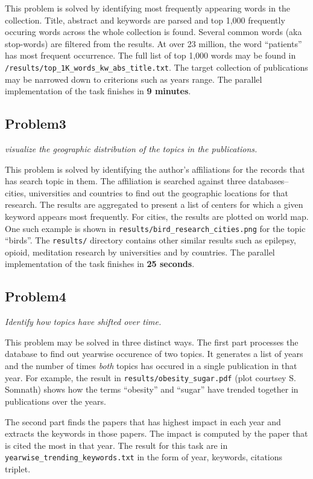 \documentclass{article}
\begin{document}
This problem is solved by identifying most frequently appearing words in the
collection. Title, abstract and keywords are parsed and top 1,000 frequently
occuring words across the whole collection is found. Several common words (aka
stop-words) are filtered from the results. At over 23 million, the word
``patients'' has most frequent occurrence. The full list of top 1,000 words
may be found in \texttt{/results/top\_1K\_words\_kw\_abs\_title.txt}. The
target collection of publications may be narrowed down to criterions such as
years range.  The parallel implementation of the task finishes in \textbf{9
minutes}.

\subsection*{Problem3}
\textit{visualize the geographic distribution of the topics in the publications.}

This problem is solved by identifying the author's affiliations for the records
that has search topic in them. The affiliation is searched against
three databases--cities, universities and countries to find out the geographic
locations for that research. The results are aggregated to present a list of
centers for which a given keyword appears most frequently. For cities, the
results are plotted on world map. One such example is shown in
\texttt{results/bird\_research\_cities.png} for the topic ``birds''. The \texttt{results/}
directory contains other similar results such as epilepsy, opioid,
meditation research by universities and by countries. The parallel
implementation of the task finishes in \textbf{25 seconds}.

\subsection*{Problem4}
\textit{Identify how topics have shifted over time.}

This problem may be solved in three distinct ways. The first part processes the
database to find out yearwise occurence of two topics. It generates a
list of years and the number of times \textit{both} topics has occured in a
single publication in that year. For example, the result in
\texttt{results/obesity\_sugar.pdf} (plot courtsey S.  Somnath) shows how the
terms ``obesity'' and ``sugar'' have trended together in publications over the
years.

The second part finds the papers that has highest impact in each year and
extracts the keywords in those papers. The impact is computed by the paper that
is cited the most in that year. The result for this task are in
\texttt{yearwise\_trending\_keywords.txt} in the form of year,
keywords, citations triplet.
\end{document}
